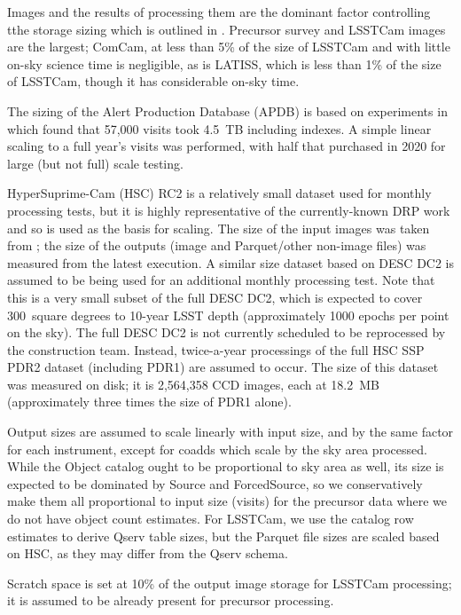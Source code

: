 Images and the results of processing them are the dominant factor controlling tthe storage sizing which is outlined in .
Precursor survey and LSSTCam images are the largest; ComCam, at less than 5\% of the size of LSSTCam and with little on-sky science time is negligible, as is LATISS, which is less than 1\% of the size of LSSTCam, though it has considerable on-sky time.

The sizing of the Alert Production Database (APDB) is based on experiments in \cite{DMTN-113} which found that 57,000 visits took 4.5~TB including indexes.
A simple linear scaling to a full year's visits was performed, with half that purchased in 2020 for large (but not full) scale testing.

HyperSuprime-Cam (HSC) RC2 is a relatively small dataset used for monthly processing tests, but it is highly representative of the currently-known DRP work and so is used as the basis for scaling.
The size of the input images was taken from \cite{DMTN-091}; the size of the outputs (image and Parquet/other non-image files) was measured from the latest execution.
A similar size dataset based on DESC DC2 is assumed to be being used for an additional monthly processing test.
Note that this is a very small subset of the full DESC DC2, which is expected to cover 300~square degrees to 10-year LSST depth (approximately 1000 epochs per point on the sky).
The full DESC DC2 is not currently scheduled to be reprocessed by the construction team.
Instead, twice-a-year processings of the full HSC SSP PDR2 dataset (including PDR1) are assumed to occur.
The size of this dataset was measured on disk; it is 2,564,358 CCD images, each at 18.2~MB (approximately three times the size of PDR1 alone).

Output sizes are assumed to scale linearly with input size, and by the same factor for each instrument, except for coadds which scale by the sky area processed.
While the Object catalog ought to be proportional to sky area as well, its size is expected to be dominated by Source and ForcedSource, so we conservatively make them all proportional to input size (visits) for the precursor data where we do not have object count estimates.
For LSSTCam, we use the catalog row estimates to derive Qserv table sizes, but the Parquet file sizes are scaled based on HSC, as they may differ from the Qserv schema.

Scratch space is set at 10\% of the output image storage for LSSTCam processing; it is assumed to be already present for precursor processing.

